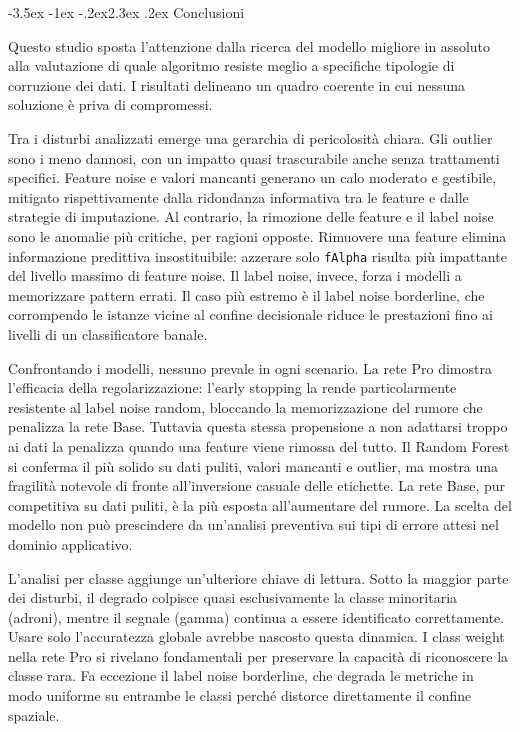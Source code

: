 \documentclass[12pt,a4paper]{article}
\makeatletter
\renewcommand\section{\@startsection{section}{1}{\z@}%
  {-3.5ex \@plus -1ex \@minus -.2ex}{2.3ex \@plus.2ex}%
  {\normalfont\Large\bfseries}}
\makeatother
\begin{document}
\section{Conclusioni}\label{sec:conclusioni}

Questo studio sposta l'attenzione dalla ricerca del modello migliore in assoluto
alla valutazione di quale algoritmo resiste meglio a specifiche tipologie di
corruzione dei dati. I risultati delineano un quadro coerente in cui nessuna
soluzione è priva di compromessi.

Tra i disturbi analizzati emerge una gerarchia di pericolosità chiara. Gli
outlier sono i meno dannosi, con un impatto quasi trascurabile anche senza
trattamenti specifici. Feature noise e valori mancanti generano un calo moderato
e gestibile, mitigato rispettivamente dalla ridondanza informativa tra le
feature e dalle strategie di imputazione. Al contrario, la rimozione delle
feature e il label noise sono le anomalie più critiche, per ragioni opposte.
Rimuovere una feature elimina informazione predittiva insostituibile: azzerare
solo \texttt{fAlpha} risulta più impattante del livello massimo di feature
noise. Il label noise, invece, forza i modelli a memorizzare pattern errati. Il
caso più estremo è il label noise borderline, che corrompendo le istanze vicine
al confine decisionale riduce le prestazioni fino ai livelli di un
classificatore banale.

Confrontando i modelli, nessuno prevale in ogni scenario. La rete Pro dimostra
l'efficacia della regolarizzazione: l'early stopping la rende particolarmente
resistente al label noise random, bloccando la memorizzazione del rumore che
penalizza la rete Base. Tuttavia questa stessa propensione a non adattarsi
troppo ai dati la penalizza quando una feature viene rimossa del tutto. Il
Random Forest si conferma il più solido su dati puliti, valori mancanti e
outlier, ma mostra una fragilità notevole di fronte all'inversione casuale delle
etichette. La rete Base, pur competitiva su dati puliti, è la più esposta
all'aumentare del rumore. La scelta del modello non può prescindere da
un'analisi preventiva sui tipi di errore attesi nel dominio applicativo.

L'analisi per classe aggiunge un'ulteriore chiave di lettura. Sotto la maggior
parte dei disturbi, il degrado colpisce quasi esclusivamente la classe
minoritaria (adroni), mentre il segnale (gamma) continua a essere identificato
correttamente. Usare solo l'accuratezza globale avrebbe nascosto questa
dinamica. I class weight nella rete Pro si rivelano fondamentali per preservare
la capacità di riconoscere la classe rara. Fa eccezione il label noise
borderline, che degrada le metriche in modo uniforme su entrambe le classi
perché distorce direttamente il confine spaziale.
\end{document}
